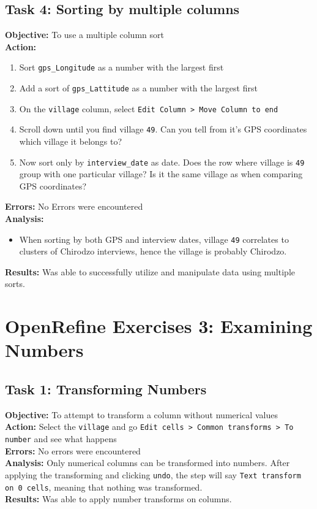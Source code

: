\documentclass{article}
\begin{document}
\subsection{Task 4: Sorting by multiple columns}
\textbf{Objective:} To use a multiple column sort\\
\textbf{Action:}
\begin{enumerate}
    \item Sort \texttt{gps\_Longitude} as a number with the largest first
    \item Add a sort of \texttt{gps\_Lattitude} as a number with the largest first
    \item On the \texttt{village} column, select \texttt{Edit Column > Move Column to end}
    \item Scroll down until you find village \texttt{49}. Can you tell from it's GPS coordinates which village it belongs to?
    \item Now sort only by \texttt{interview\_date} as date. Does the row where village is \texttt{49} group with one particular village? Is it the same village as when comparing GPS coordinates?
\end{enumerate}
\textbf{Errors:} No Errors were encountered\\
\textbf{Analysis:}
\begin{itemize}
    \item When sorting by both GPS and interview dates, village \texttt{49} correlates to clusters of Chirodzo interviews, hence the village is probably Chirodzo.
\end{itemize}
\textbf{Results:} Was able to successfully utilize and manipulate data using multiple sorts.
\section{OpenRefine Exercises 3: Examining Numbers}
\subsection{Task 1: Transforming Numbers}
\textbf{Objective:} To attempt to transform a column without numerical values\\
\textbf{Action:} Select the \texttt{village} and go \texttt{Edit cells > Common transforms > To number} and see what happens\\
\textbf{Errors:} No errors were encountered\\
\textbf{Analysis:} Only numerical columns can be transformed into numbers. After applying the transforming and clicking \texttt{undo}, the step will say \texttt{Text transform on 0 cells}, meaning that nothing was transformed.\\
\textbf{Results:} Was able to apply number transforms on columns.
\end{document}
